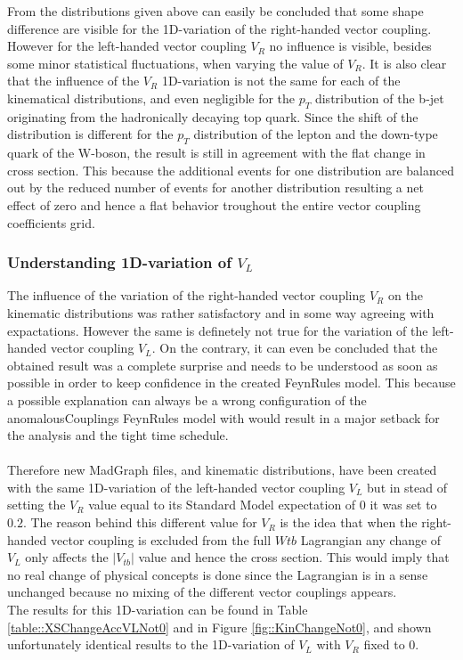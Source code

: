 From the distributions given above can easily be concluded that some shape difference are visible for the 1D-variation of the right-handed vector coupling. However for the left-handed vector coupling $V_R$ no influence is visible, besides some minor statistical fluctuations, when varying the value of $V_R$. It is also clear that the influence of the $V_R$ 1D-variation is not the same for each of the kinematical distributions, and even negligible for the $p_T$ distribution of the b-jet originating from the hadronically decaying top quark. Since the shift of the distribution is different for the $p_T$ distribution of the lepton and the down-type quark of the W-boson, the result is still in agreement with the flat change in cross section. This because the additional events for one distribution are balanced out by the reduced number of events for another distribution resulting a net effect of zero and hence a flat behavior troughout the entire vector coupling coefficients grid.

\subsubsection{Understanding 1D-variation of $V_L$}
The influence of the variation of the right-handed vector coupling $V_R$ on the kinematic distributions was rather satisfactory and in some way agreeing with expactations. However the same is definetely not true for the variation of the left-handed vector coupling $V_L$. On the contrary, it can even be concluded that the obtained result was a complete surprise and needs to be understood as soon as possible in order to keep confidence in the created FeynRules model. This because a possible explanation can always be a wrong configuration of the anomalousCouplings FeynRules model with would result in a major setback for the analysis and the tight time schedule.\\
\\
Therefore new MadGraph files, and kinematic distributions, have been created with the same 1D-variation of the left-handed vector coupling $V_L$ but in stead of setting the $V_R$ value equal to its Standard Model expectation of $0$ it was set to $0.2$. The reason behind this different value for $V_R$ is the idea that when the right-handed vector coupling is excluded from the full $Wtb$ Lagrangian any change of $V_L$ only affects the $\vert V_{tb} \vert$ value and hence the cross section. This would imply that no real change of physical concepts is done since the Lagrangian is in a sense unchanged because no mixing of the different vector couplings appears.\\
The results for this 1D-variation can be found in Table \ref{table::XSChangeAccVLNot0} and in Figure \ref{fig::KinChangeNot0}, and shown unfortunately identical results to the 1D-variation of $V_L$ with $V_R$ fixed to $0$. 

